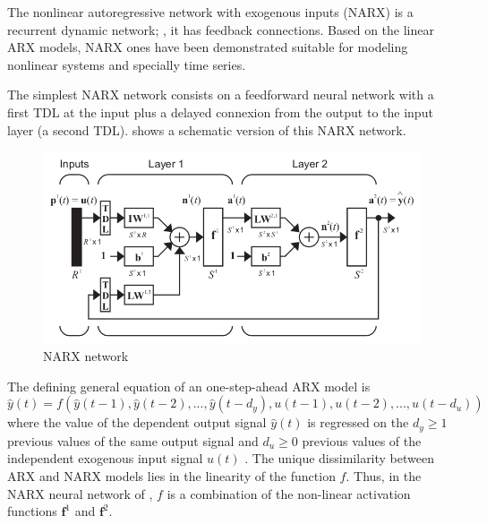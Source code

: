 
\label{subsec:ANN:NARX}

The nonlinear autoregressive network with exogenous inputs (NARX) is a recurrent dynamic network; \ie, it has feedback connections. 
Based on the linear ARX models, NARX ones have been demonstrated 
suitable for modeling nonlinear systems and specially time series. 

The simplest NARX network consists on a feedforward neural network with a first TDL at the input 
plus a delayed connexion from the output to the input layer (a second TDL). 
 shows a schematic version of this NARX network.

\begin{figure}[!ht]
\centering
\includegraphics[width=\textwidth]{images/narx.png}
\caption{NARX network}
\label{fig:narx}
\end{figure}

The defining general equation of an one-step-ahead ARX model is
\begin{equation}
\hat{y}(t) =f(\hat{y}(t-1),\hat{y}(t-2),...,\hat{y}(t-d_{y}), u(t-1),u(t-2),...,u(t-d_{u}))
\end{equation}
where the value of the dependent output signal $\hat{y}(t)$ is 
regressed on the $d_{y}\geq1$ previous values of the same output signal 
and $d_{u}\geq0$ previous values of the independent exogenous input 
signal $u(t)$ \cite{lin1996learning}. 
The unique dissimilarity between ARX and NARX models lies in the linearity of the function $f$. 
Thus, in the NARX neural network of , 
$f$ is a combination of the non-linear activation functions $\mathbf{f}^1$ and $\mathbf{f}^2$.

